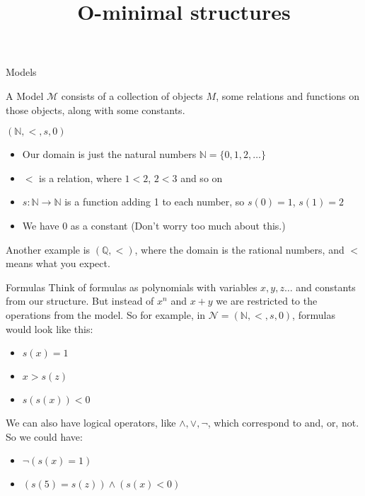\documentclass{beamer}
\title{O-minimal structures}
\begin{document}
\begin{frame}
    \titlepage
\end{frame}

\begin{frame}{Models}
    \begin{definition}
        A Model  $\mathcal{M}$ consists of a collection of objects $M$, some relations and functions on those objects, along with some constants.
    \end{definition}
    
\begin{example}
    $(\mathbb{N}, <, s, 0)$
     \begin{itemize}
         \item Our domain is just the natural numbers $\mathbb{N} = \{0, 1, 2, \ldots \}$
         \item $<$ is a relation, where $1 < 2$, $2 < 3$ and so on
         \item $s:\mathbb{N} \to \mathbb{N}$ is a function adding 1 to each number, so $s(0) = 1$, $s(1) = 2$
         \item We have $0$ as a constant (Don't worry too much about this.)
     \end{itemize}
     Another example is $(\mathbb{Q}, <)$, where the domain is the rational numbers, and $<$ means what you expect.
\end{example}
\end{frame}

\begin{frame}{Formulas}
    Think of formulas as polynomials with variables $x,y,z \ldots$ and constants from our structure. But instead of $x^n$ and $x + y$ we are restricted to the operations from the model. So for example, in $\mathcal{N} = (\mathbb{N}, <, s, 0)$, formulas would look like this:
    \begin{itemize}
        \item $s(x) = 1$
        \item $x > s(z)$
        \item $s(s(x)) < 0$
    \end{itemize}
    We can also have logical operators, like $\land, \lor, \neg$, which correspond to and, or, not. So we could have:
    \begin{itemize}
        \item $\neg(s(x) = 1)$
        \item $(s(5) = s(z)) \land (s(x) < 0)$
    \end{itemize}
\end{frame}
\end{document}
